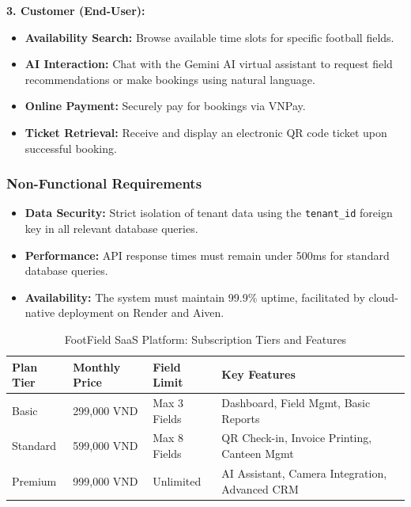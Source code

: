 \textbf{3. Customer (End-User):}
\begin{itemize}
    \item \textbf{Availability Search:} Browse available time slots for specific football fields.
    \item \textbf{AI Interaction:} Chat with the Gemini AI virtual assistant to request field recommendations or make bookings using natural language.
    \item \textbf{Online Payment:} Securely pay for bookings via VNPay.
    \item \textbf{Ticket Retrieval:} Receive and display an electronic QR code ticket upon successful booking.
\end{itemize}

\subsubsection{Non-Functional Requirements}
\begin{itemize}
    \item \textbf{Data Security:} Strict isolation of tenant data using the \texttt{tenant\_id} foreign key in all relevant database queries.
    \item \textbf{Performance:} API response times must remain under 500ms for standard database queries.
    \item \textbf{Availability:} The system must maintain 99.9\% uptime, facilitated by cloud-native deployment on Render and Aiven.
\end{itemize}


\begin{table}[htbp]
\centering
\begin{tabularx}{\textwidth}{|l|l|l|X|}
\hline
\rowcolor{LightCyan}
\textbf{Plan Tier} & \textbf{Monthly Price} & \textbf{Field Limit} & \textbf{Key Features} \\ \hline
Basic & 299,000 VND & Max 3 Fields & Dashboard, Field Mgmt, Basic Reports \\ \hline
Standard & 599,000 VND & Max 8 Fields & QR Check-in, Invoice Printing, Canteen Mgmt \\ \hline
Premium & 999,000 VND & Unlimited & AI Assistant, Camera Integration, Advanced CRM \\ \hline
\end{tabularx}
\caption{FootField SaaS Platform: Subscription Tiers and Features}
\label{tab:saas_tiers}
\end{table}

